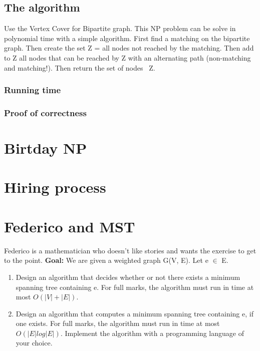 \documentclass[12pt]{article}
\begin{document}
\subsection{The algorithm}
Use the Vertex Cover for Bipartite graph. This NP problem can be solve in polynomial time with a simple algorithm. First find a matching on the bipartite graph. Then create the set Z = all nodes not reached by the matching. Then add to Z all nodes that can be reached by Z with an alternating path (non-matching and matching!). Then return the set of nodes \ Z.

\subsubsection{Running time}

\subsubsection{Proof of correctness}

\section{Birtday NP}

\section{Hiring process}

\section{Federico and MST}
Federico is a mathematician who doesn't like stories and wants the exercise to get to the point.
\newline
\textbf{Goal:} We are given a weighted graph G(V, E). Let e $\in$ E.
\begin{enumerate}
	\item Design an algorithm that decides whether or not there exists a minimum spanning tree containing e. For full marks, the algorithm must run in time at most $O(|V | + |E|)$.
	\item Design an algorithm that computes a minimum spanning tree containing e, if one exists. For full marks, the algorithm must run in time at most $O(|E| log |E|)$. Implement the algorithm with a programming language of your choice.
\end{enumerate}
\end{document}
